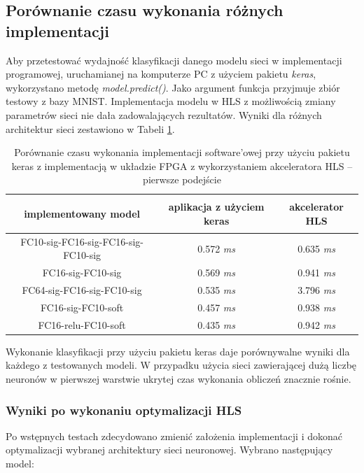 \subsection{Porównanie czasu wykonania różnych implementacji}

Aby przetestować wydajność klasyfikacji danego modelu sieci w implementacji programowej, uruchamianej na komputerze PC z użyciem pakietu \emph{keras}, wykorzystano metodę \emph{model.predict()}. Jako argument funkcja przyjmuje zbiór testowy z bazy MNIST.
Implementacja modelu w HLS z możliwością zmiany parametrów sieci nie dała zadowalających rezultatów. Wyniki dla różnych architektur sieci zestawiono w Tabeli \ref{tab:czas-wykonania}. 

\begin{table}[h] \centering
  \caption{Porównanie czasu wykonania implementacji software'owej przy użyciu pakietu keras z implementacją w układzie FPGA z wykorzystaniem akceleratora HLS -- pierwsze podejście}
  \centering
  \begin{tabular} {c|c|c} \hline \label{tab:czas-wykonania}
      
    implementowany model & aplikacja z użyciem keras & akcelerator HLS\\ \hline
    FC10-sig-FC16-sig-FC16-sig-FC10-sig & 0.572 \emph{ms} & 0.635 \emph{ms} \\
    FC16-sig-FC10-sig & 0.569 \emph{ms} & 0.941 \emph{ms} \\
    FC64-sig-FC16-sig-FC10-sig & 0.535 \emph{ms} & 3.796 \emph{ms} \\
    FC16-sig-FC10-soft & 0.457 \emph{ms} & 0.938 \emph{ms} \\
    FC16-relu-FC10-soft & 0.435 \emph{ms} & 0.942 \emph{ms} \\
    \end{tabular}
  \end{table}

  Wykonanie klasyfikacji przy użyciu pakietu keras daje porównywalne wyniki dla każdego z testowanych modeli. W przypadku użycia sieci zawierającej dużą liczbę neuronów w pierwszej warstwie ukrytej czas wykonania obliczeń znacznie rośnie.


  \subsubsection{Wyniki po wykonaniu optymalizacji HLS}
  Po wstępnych testach zdecydowano zmienić założenia implementacji i dokonać optymalizacji wybranej architektury sieci neuronowej. Wybrano następujący model:

